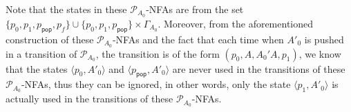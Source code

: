 \documentclass[preprint,12pt]{elsarticle}
\newcommand\Pp{{\mathcal{P} }}
\newcommand\act{{\sf Act}}
\newcommand\post{{\mathsf{post} }}
\newcommand{\hide}[1]{}
\newcommand\Aut{{\mathfrak{A} }}
\newcommand\Lang{{\mathscr{L} }}
\newcommand{\NFA}{\textsf{NFA}}
\newcommand\pop{\mathsf{pop}}
\begin{document}
Note that the states in these $\Pp_{A_0}$-{\NFA}s are from the set $\{p_0, p_1, p_\pop, p_f\} \cup \{p_0, p_1, p_\pop\} \times \Gamma_{A_0}$.
Moreover, from the aforementioned construction of these $\Pp_{A_0}$-{\NFA}s and the fact that each time when $A'_0$ is pushed in a transition of $\Pp_{A_0}$, the transition is of the form $(p_0, A, A_0'A, p_1)$, we know that the states $\langle p_0, A'_0\rangle$ and $\langle p_\pop, A'_0\rangle$ are never used in the transitions of these $\Pp_{A_0}$-{\NFA}s, thus they can be ignored, in other words, only the state $\langle p_1, A'_0\rangle$ is actually used in the transitions of these $\Pp_{A_0}$-{\NFA}s. 


\hide{
In the sequel, we define the following $\Pp_{A_0}$-{\NFA}s,  
\begin{itemize}
    \item $\Aut_{A_0}$ such that $\Lang(\Aut_{A_0}) = \{A_0\}$, 
    \item $\Aut_{A_0\rightsquigarrow B}$ for $B \in \Gamma_{A_0} \setminus \{A_0'\}$ such that $\Lang(\Aut_{A_0\rightsquigarrow B}) = B\act^* \cap \Lang((\Aut_{A_0})^{\post^*}_{\Pp_{A_0}}(p_0))$,
    \item $\Aut_{A_0\stackrel{C}\rightsquigarrow B}$ for $B\in\Gamma_{A_0}$ and $C\in\Gamma_{A_0}\setminus\{A_0'\}$  such that
    $$
    \Lang(\Aut_{A_0\stackrel{C}\rightsquigarrow B})  = 
    \left\{ 
    \begin{array}{lc}
        \{A'_0 w \mid w \in  \Lang(\Aut_{A_0 \rightsquigarrow C}) \} & \mbox{ if } B=A_0', \\
        B\act^*A_0'C\act^*\cap\Lang((\Aut_{A_0 \stackrel{C}\rightsquigarrow A_0'})^{\post^*}_{\Pp_{A_0}}(p_1))& \mbox{ otherwise}.
    \end{array}
\right.$$
\end{itemize}
}
\end{document}
